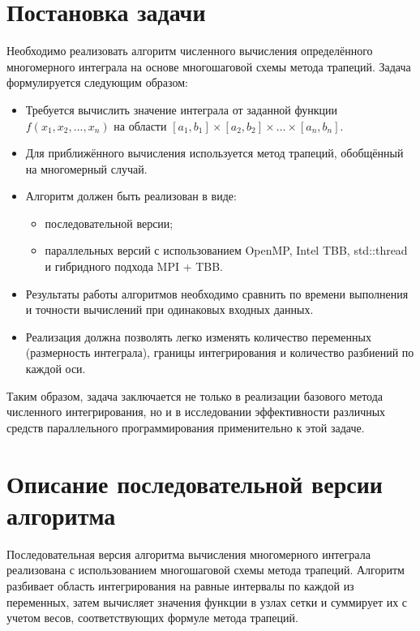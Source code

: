 \documentclass[a4paper,14pt]{article}
\begin{document}
\newpage
\section{Постановка задачи}

Необходимо реализовать алгоритм численного вычисления определённого многомерного интеграла на основе многошаговой схемы метода трапеций. Задача формулируется следующим образом:

\begin{itemize}
    \item Требуется вычислить значение интеграла от заданной функции $f(x_1, x_2, ..., x_n)$ на области $[a_1, b_1] \times [a_2, b_2] \times \dots \times [a_n, b_n]$.
    \item Для приближённого вычисления используется метод трапеций, обобщённый на многомерный случай.
    \item Алгоритм должен быть реализован в виде:
    \begin{itemize}
        \item последовательной версии;
        \item параллельных версий с использованием OpenMP, Intel TBB, std::thread и гибридного подхода MPI + TBB.
    \end{itemize}
    \item Результаты работы алгоритмов необходимо сравнить по времени выполнения и точности вычислений при одинаковых входных данных.
    \item Реализация должна позволять легко изменять количество переменных (размерность интеграла), границы интегрирования и количество разбиений по каждой оси.
\end{itemize}

Таким образом, задача заключается не только в реализации базового метода численного интегрирования, но и в исследовании эффективности различных средств параллельного программирования применительно к этой задаче.

\newpage
\section{Описание последовательной версии алгоритма}

Последовательная версия алгоритма вычисления многомерного интеграла реализована с использованием многошаговой схемы метода трапеций. Алгоритм разбивает область интегрирования на равные интервалы по каждой из переменных, затем вычисляет значения функции в узлах сетки и суммирует их с учетом весов, соответствующих формуле метода трапеций.
\end{document}
